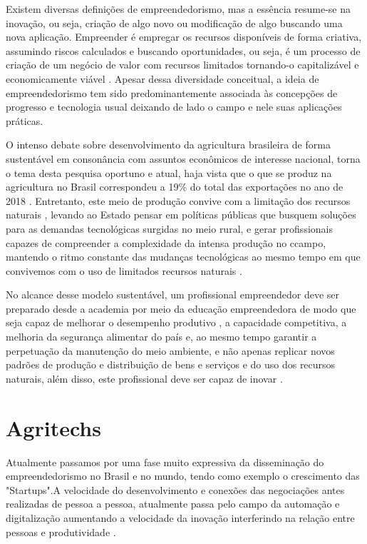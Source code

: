 Existem diversas definições de empreendedorismo, mas a essência resume-se na inovação, ou seja, criação de algo novo ou modificação de algo buscando uma nova aplicação. Empreender é empregar os recursos disponíveis de forma criativa, assumindo riscos calculados e buscando oportunidades, ou seja, é um processo de criação de um negócio de valor com recursos limitados tornando-o capitalizável e economicamente viável  \cite{costa_empreendedorismo_2006, stevenson_new_1989, lopes_educacao_2010}. Apesar dessa diversidade conceitual, a ideia de empreendedorismo tem sido predominantemente associada às concepções de progresso e tecnologia usual deixando de lado o campo e nele suas aplicações práticas.  

O intenso debate sobre desenvolvimento da agricultura brasileira de forma sustentável em consonância com assuntos econômicos de interesse nacional, torna o tema desta pesquisa oportuno e atual, haja vista que o que se produz na agricultura no Brasil correspondeu a 19\% do total das exportações no ano de 2018 \cite{mdic_comex_2019}. Entretanto, este meio de produção convive com a limitação dos recursos naturais \cite{jacobi_meio_1999}, levando ao Estado pensar em políticas públicas que busquem soluções para as demandas tecnológicas surgidas no meio rural, e gerar profissionais capazes de compreender a complexidade da intensa produção no ccampo, mantendo o ritmo constante das mudanças tecnológicas ao mesmo tempo em que convivemos com o uso de limitados recursos naturais  \cite{costa_dinamica_2016}.

No alcance desse modelo sustentável, um profissional empreendedor deve ser preparado desde a academia por meio da educação empreendedora de modo que seja capaz de melhorar o desempenho produtivo \cite{da_silva_qualidade_2017}, a capacidade competitiva, a melhoria da segurança alimentar do país \cite{hoffmann_brasil_2015} e, ao mesmo tempo garantir a perpetuação da manutenção do meio ambiente, e não apenas replicar novos padrões de produção e distribuição de bens e serviços e do uso dos recursos naturais, além disso, este profissional deve ser capaz de inovar \cite{morais_empreendedorismo_2018}.



\section{Agritechs}

Atualmente passamos por uma fase muito expressiva da disseminação do empreendedorismo no Brasil e no mundo, tendo como exemplo o crescimento das "Startups".A velocidade do desenvolvimento e conexões das negociações antes realizadas de pessoa a pessoa, atualmente passa pelo campo da automação e digitalização aumentando a velocidade da inovação interferindo na relação entre pessoas e produtividade  \cite{campos_o_2016}. 

